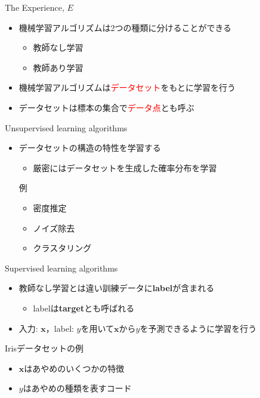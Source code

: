 \documentclass[dvipdfmx, 10pt]{beamer}
\begin{document}
\begin{frame}{The Experience, $E$}
  \begin{itemize}
    \item 機械学習アルゴリズムは2つの種類に分けることができる
      \begin{itemize}
        \item 教師なし学習
        \item 教師あり学習
      \end{itemize}
    \item 機械学習アルゴリズムは\textcolor{red}{データセット}をもとに学習を行う
    \item データセットは標本の集合で\textcolor{red}{データ点}とも呼ぶ
  \end{itemize}
\end{frame}


\begin{frame}{Unsupervised learning algorithms}
  \begin{itemize}
    \item データセットの構造の特性を学習する
    \begin{itemize}
      \item 厳密にはデータセットを生成した確率分布を学習
    \end{itemize}
    \begin{exampleblock}{例}
      \begin{itemize}
        \item 密度推定
        \item ノイズ除去
        \item クラスタリング
      \end{itemize}
    \end{exampleblock}
  \end{itemize}
\end{frame}


\begin{frame}{Supervised learning algorithms}
  \begin{itemize}
    \item 教師なし学習とは違い訓練データに{\bf label}が含まれる
    \begin{itemize}
      \item labelは{\bf target}とも呼ばれる
    \end{itemize}
    \item 入力: $\bm{x}$，label: $y$を用いて$\bm{x}$から$y$を予測できるように学習を行う
  \end{itemize}
  \begin{exampleblock}{Irisデータセットの例}
    \begin{itemize}
      \item $\bm{x}$はあやめのいくつかの特徴
      \item $y$はあやめの種類を表すコード
    \end{itemize}
  \end{exampleblock}
\end{frame}
\end{document}
